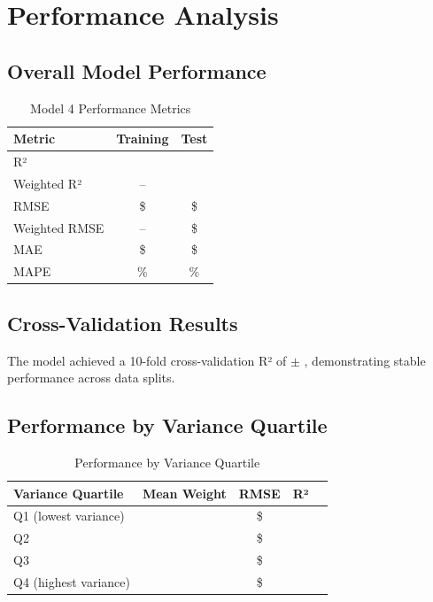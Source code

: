\section{Performance Analysis}

\subsection{Overall Model Performance}

\begin{table}[h]
\centering
\caption{Model 4 Performance Metrics}
\begin{tabular}{lcc}
\toprule
\textbf{Metric} & \textbf{Training} & \textbf{Test} \\
\midrule
R² & \ModelFourRSquaredTrain{} & \ModelFourRSquaredTest{} \\
Weighted R² & -- & \ModelFourWeightedRSquared{} \\
RMSE & \$\ModelFourRMSETrain{} & \$\ModelFourRMSETest{} \\
Weighted RMSE & -- & \$\ModelFourWeightedRMSE{} \\
MAE & \$\ModelFourMAETrain{} & \$\ModelFourMAETest{} \\
MAPE & \ModelFourMAPETrain{}\% & \ModelFourMAPETest{}\% \\
\bottomrule
\end{tabular}
\end{table}

\subsection{Cross-Validation Results}

The model achieved a 10-fold cross-validation R² of \ModelFourCVMean{} $\pm$ \ModelFourCVStd{}, demonstrating stable performance across data splits.

\subsection{Performance by Variance Quartile}

\begin{table}[h]
\centering
\caption{Performance by Variance Quartile}
\begin{tabular}{lcccc}
\toprule
\textbf{Variance Quartile} & \textbf{Mean Weight} & \textbf{RMSE} & \textbf{R²} \\
\midrule
Q1 (lowest variance) & \ModelFourVarQOneMeanWeight{} & \$\ModelFourVarQOneRMSE{} & \ModelFourVarQOneRSquared{} \\
Q2 & \ModelFourVarQTwoMeanWeight{} & \$\ModelFourVarQTwoRMSE{} & \ModelFourVarQTwoRSquared{} \\
Q3 & \ModelFourVarQThreeMeanWeight{} & \$\ModelFourVarQThreeRMSE{} & \ModelFourVarQThreeRSquared{} \\
Q4 (highest variance) & \ModelFourVarQFourMeanWeight{} & \$\ModelFourVarQFourRMSE{} & \ModelFourVarQFourRSquared{} \\
\bottomrule
\end{tabular}
\end{table}

